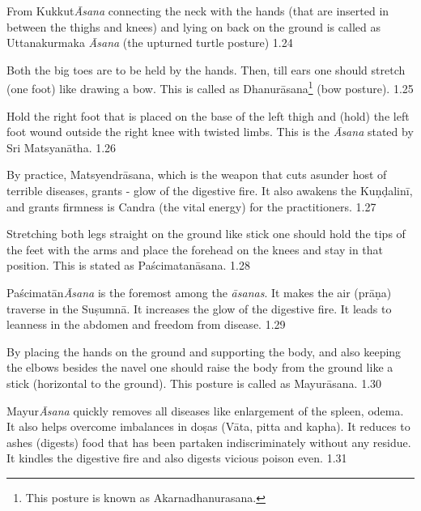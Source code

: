 From Kukkut\textit{Āsana} connecting the neck with the hands (that are inserted in between the thighs and knees) and lying on back on the ground is called as Uttanakurmaka \textit{Āsana} (the upturned turtle posture) 1.24


Both the big toes are to be held by the hands. Then, till ears one should stretch (one foot)  like drawing a bow. This is called as Dhanurāsana\footnote{This posture is known as Akarnadhanurasana.} (bow posture). 1.25


Hold the right foot that is placed on the base of the left thigh and (hold) the left foot wound outside the right knee with twisted limbs. This is the \textit{Āsana} stated by Sri Matsyanātha. 1.26


By practice, Matsyendrāsana, which is the weapon that cuts asunder host of terrible diseases, grants - glow of the digestive fire. It also awakens the  Kuṇḍalinī, and grants firmness is Candra (the vital energy) for the practitioners. 1.27
\medskip


Stretching both legs straight on the ground like stick one should hold the tips of the feet with the arms and place the forehead on the knees and stay in that position. This is stated as Paścimatanāsana.  1.28



Paścimatān\textit{Āsana} is the foremost among the \textit{āsanas}. It makes the air (prāṇa) traverse in the Suṣumnā. It increases the glow of the digestive fire. It leads to leanness in the abdomen and freedom from disease.  1.29
\medskip


By placing the hands on the ground and supporting the body, and also keeping the elbows besides the navel one should raise the body from the ground like a stick (horizontal to the ground). This posture is called as Mayurāsana.  1.30


Mayur\textit{Āsana} quickly removes all diseases like enlargement of the spleen, odema. It also helps overcome imbalances in doṣas (Vāta, pitta and kapha). It reduces to ashes (digests) food that has been partaken indiscriminately without any residue. It kindles the digestive fire and also digests vicious poison even. 1.31
\medskip

